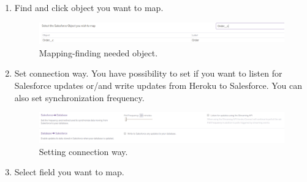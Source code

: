 \documentclass[12pt,a4paper]{article}
\begin{document}
\begin{enumerate}
\item Find and click object you want to map.
\begin{figure}[H]
	\centering
	\includegraphics[width=1\textwidth]{images/connect7.PNG}
	\caption{Mapping-finding needed object.}
	\label{fig:cong}
\end{figure}

\item Set connection way. You have possibility to set if you want to listen for Salesforce updates or/and write updates from Heroku to Salesforce. You can also set synchronization frequency. 
\begin{figure}[H]
	\centering
	\includegraphics[width=1\textwidth]{images/connect8.PNG}
	\caption{Setting connection way.}
	\label{fig:conh}
\end{figure}

\item Select field you want to map. 


\end{enumerate}
\end{document}
